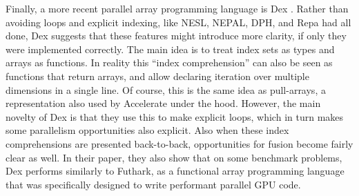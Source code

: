        Finally, a more recent parallel array programming language is Dex \cite{maclaurin2019dex,paszke2021getting}.
        Rather than avoiding loops and explicit indexing, like NESL, NEPAL, DPH, and Repa had all done, Dex suggests that these features might introduce more clarity, if only they were implemented correctly.
        The main idea is to treat index sets as types and arrays as functions.
        In reality this ``index comprehension'' can also be seen as functions that return arrays, and allow declaring iteration over multiple dimensions in a single line.
        Of course, this is the same idea as pull-arrays, a representation also used by Accelerate under the hood.
        However, the main novelty of Dex is that they use this to make explicit loops, which in turn makes some parallelism opportunities also explicit.
        Also when these index comprehensions are presented back-to-back, opportunities for fusion become fairly clear as well.
        In their paper, they also show that on some benchmark problems, Dex performs similarly to Futhark, as a functional array programming language that was specifically designed to write performant parallel GPU code.
